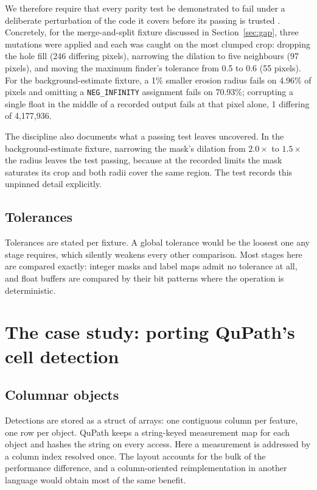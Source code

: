 \documentclass[11pt,a4paper]{article}
\begin{document}
We therefore require that every parity test be demonstrated to fail under a
deliberate perturbation of the code it covers before its passing is trusted
\cite{jia2011mutation}. Concretely, for the merge-and-split fixture discussed
in Section~\ref{sec:gap}, three mutations were applied and each was caught on
the most clumped crop: dropping the hole fill (246 differing pixels), narrowing
the dilation to five neighbours (97 pixels), and moving the maximum finder's
tolerance from 0.5 to 0.6 (55 pixels). For the background-estimate fixture, a
1\% smaller erosion radius fails on 4.96\% of pixels and omitting a
\texttt{NEG\_INFINITY} assignment fails on 70.93\%; corrupting a single float
in the middle of a recorded output fails at that pixel alone, 1 differing of
4{,}177{,}936.

The discipline also documents what a passing test leaves uncovered. In the
background-estimate fixture, narrowing the mask's dilation from $2.0\times$ to
$1.5\times$ the radius leaves the test passing, because at the recorded limits
the mask saturates its crop and both radii cover the same region. The test
records this unpinned detail explicitly.

\subsection{Tolerances}

Tolerances are stated per fixture. A global tolerance would be the loosest one
any stage requires, which silently weakens every other comparison. Most stages
here are compared exactly: integer masks and label maps admit no tolerance at
all, and float buffers are compared by their bit patterns where the operation
is deterministic.

\section{The case study: porting QuPath's cell detection}
\label{sec:port}

\subsection{Columnar objects}

Detections are stored as a struct of arrays: one contiguous column per feature,
one row per object. QuPath keeps a string-keyed measurement map for each object
and hashes the string on every access. Here a measurement is addressed by a
column index resolved once. The layout accounts for the bulk of the performance
difference, and a column-oriented reimplementation in another language would
obtain most of the same benefit.
\end{document}
